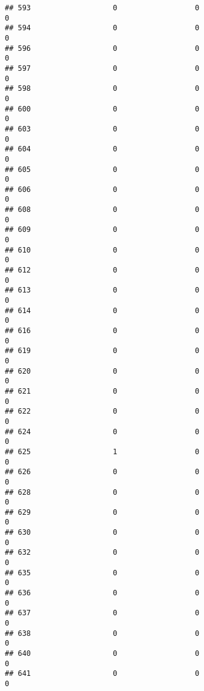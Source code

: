\documentclass[
]{article}
\begin{document}
\begin{verbatim}
## 593                   0                  0                              0
## 594                   0                  0                              0
## 596                   0                  0                              0
## 597                   0                  0                              0
## 598                   0                  0                              0
## 600                   0                  0                              0
## 603                   0                  0                              0
## 604                   0                  0                              0
## 605                   0                  0                              0
## 606                   0                  0                              0
## 608                   0                  0                              0
## 609                   0                  0                              0
## 610                   0                  0                              0
## 612                   0                  0                              0
## 613                   0                  0                              0
## 614                   0                  0                              0
## 616                   0                  0                              0
## 619                   0                  0                              0
## 620                   0                  0                              0
## 621                   0                  0                              0
## 622                   0                  0                              0
## 624                   0                  0                              0
## 625                   1                  0                              0
## 626                   0                  0                              0
## 628                   0                  0                              0
## 629                   0                  0                              0
## 630                   0                  0                              0
## 632                   0                  0                              0
## 635                   0                  0                              0
## 636                   0                  0                              0
## 637                   0                  0                              0
## 638                   0                  0                              0
## 640                   0                  0                              0
## 641                   0                  0                              0

\end{verbatim}
\end{document}
